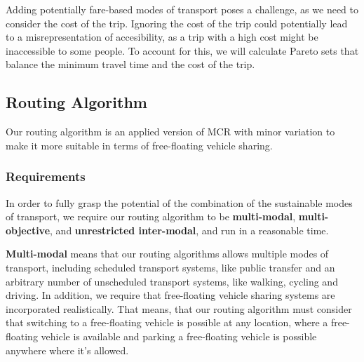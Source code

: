 Adding potentially fare-based modes of transport poses a challenge, as we need to consider the cost of the trip.
Ignoring the cost of the trip could potentially lead to a misrepresentation of accesibility, as a trip with a high cost might be inaccessible to some people.
To account for this, we will calculate Pareto sets that balance the minimum travel time and the cost of the trip.



\subsection{Routing Algorithm}
\label{subs:routing_algorithm}

Our routing algorithm is an applied version of MCR with minor variation to make it more suitable in terms of free-floating vehicle sharing.

\subsubsection{Requirements}
\label{subsubsec:requirements}


In order to fully grasp the potential of the combination of the sustainable modes of transport, we require our routing algorithm to be \textbf{multi-modal}, \textbf{multi-objective}, and \textbf{unrestricted inter-modal}, and run in a reasonable time.

\textbf{Multi-modal} means that our routing algorithms allows multiple modes of transport, including scheduled transport systems, like public transfer and an arbitrary number of unscheduled transport systems, like walking, cycling and driving.
In addition, we require that free-floating vehicle sharing systems are incorporated realistically.
That means, that our routing algorithm must consider that switching to a free-floating vehicle is possible at any location, where a free-floating vehicle is available and parking a free-floating vehicle is possible anywhere where it's allowed.

